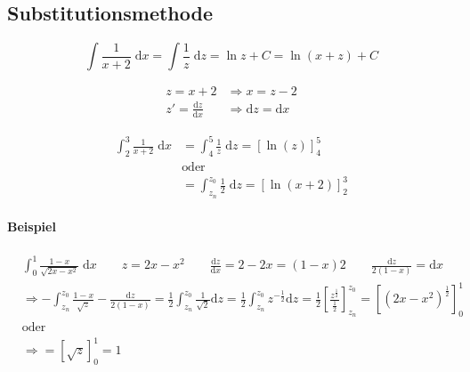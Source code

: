 \subsection{Substitutionsmethode}

\[
    \int \frac{1}{x+2} \;\mathrm{d}x = \int \frac{1}{z} \;\mathrm{d}z = \ln z + C = \ln (x+z) + C
\]

\begin{align*}
    z = x + 2 &\Rightarrow x = z - 2 \\
    z' = \frac{\mathrm{d}z}{\mathrm{d}x} &\Rightarrow \mathrm{d}z = \mathrm{d}x
\end{align*}

\begin{align*}
    \int_2^3 \frac{1}{x+2} \;\mathrm{d}x &= \int_4^5 \frac{1}{z} \;\mathrm{d}z = [\ln(z)]_4^5 \\
    &\text{oder} \\
    &= \int_{z_n}^{z_0} \frac{1}{2} \;\mathrm{d}z = [\ln(x+2)]_2^3
\end{align*}

\paragraph{Beispiel}


\begin{align*}
    &\int_0^1 \frac{1-x}{\sqrt{2x-x^2}} \;\mathrm{d}x
    \qquad z = 2x - x^2
    \qquad \frac{\mathrm{d}z}{\mathrm{d}x} = 2 - 2x = (1-x)2
    \qquad \frac{\mathrm{d}z}{2(1-x)} = \mathrm{d}x \\
    &\Rightarrow - \int_{z_n}^{z_0} \frac{1-x}{\sqrt{z}} - \frac{\mathrm{d}z}{2(1-x)}
    = \frac{1}{2} \int_{z_n}^{z_0} \frac{1}{\sqrt{2}} \mathrm{d}z
    = \frac{1}{2} \int_{z_n}^{z_0} z^{-\frac{1}{2}} \mathrm{d}z
    = \frac{1}{2} \left[ \frac{z^{\frac{1}{2}}}{\frac{1}{2}} \right]_{z_n}^{z_0}
    = \left[ \left( 2x-x^2 \right)^\frac{1}{2} \right]_0^1 \\
    &\text{oder} \\
    &\Rightarrow = \left[ \sqrt{z} \right]_0^1 = 1
\end{align*}
